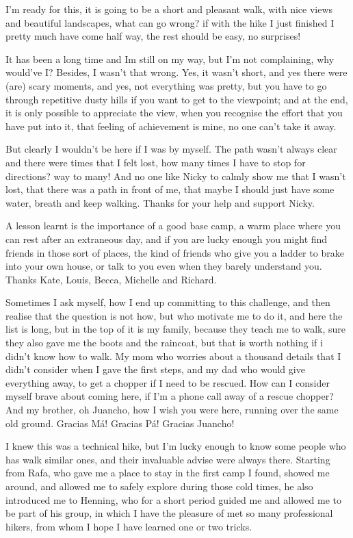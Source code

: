

I'm ready for this, it is going to be a short and pleasant walk, with nice views and beautiful landscapes, what can go wrong? if with the hike I just finished I pretty much have come half way, the rest should be easy, no surprises!

It has been a long time and Im still on my way, but I'm not complaining, why would've I? Besides, I wasn't that wrong. Yes, it wasn't short, and yes there were (are) scary moments, and yes, not everything was pretty, but you have to go through repetitive dusty hills if you want to get to the viewpoint; and at the end, it is only possible to appreciate the view, when you recognise the effort that you have put into it, that feeling of achievement is mine, no one can't take it away. 

But clearly I wouldn't be here if I was by myself. The path wasn't always clear and there were times that I felt lost, how many times I have to stop for directions? way to many! And no one like Nicky to calmly show me that I wasn't lost, that there was a path in front of me, that maybe I should just have some water, breath and keep walking. Thanks for your help and support Nicky.

A lesson learnt is the importance of a good base camp, a  warm place where you can rest after an extraneous day, and if you are lucky enough you might find friends in those sort of places, the kind of friends who give you a ladder to brake into your own house, or talk to you even when they barely understand you. Thanks Kate, Louis, Becca, Michelle and Richard.

Sometimes I ask myself, how I end up committing to this challenge, and then realise that the question is not how, but who motivate me to do it, and here the list is long, but in the top of it is my family, because they teach me to walk, sure they also gave me the boots and the raincoat, but that is worth nothing if i didn't know how to walk. My mom who worries about a thousand details that I didn't consider when I gave the first steps, and my dad who would give everything away, to get a chopper if I need to be rescued. How can I consider myself brave about coming here, if I'm a phone call away of a rescue chopper? And my brother, oh Juancho, how I wish you were here, running over the same old ground. Gracias M\'a! Gracias P\'a! Gracias Juancho!

I knew this was a technical hike, but I'm lucky enough to know some people who has walk similar ones, and their invaluable advise were always there. Starting from Rafa, who gave me a place to stay in the first camp I found, showed me around, and allowed me to safely explore during those cold times, he also introduced me to Henning, who for a short period guided me and allowed me to be part of his group, in which I have the pleasure of met so many professional hikers, from whom I hope I have learned one or two tricks.

